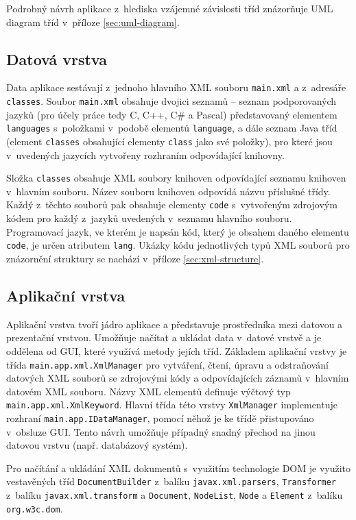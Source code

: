 \documentclass[czech,BP]{thesiskiv}
\begin{document}
\noindent
Podrobný návrh aplikace z~hlediska vzájemné závislosti tříd znázorňuje UML diagram tříd v~příloze \ref{sec:uml-diagram}.

\subsection{Datová vrstva}
Data aplikace sestávají z~jednoho hlavního XML souboru \texttt{main.xml} a z~adresáře \texttt{classes}. Soubor \texttt{main.xml} obsahuje dvojici seznamů -- seznam podporovaných jazyků (pro účely práce tedy C, C++, C\# a Pascal) představovaný elementem \texttt{languages} s~položkami v~podobě elementů \texttt{language}, a dále seznam Java tříd (element \texttt{classes} obsahující elementy \texttt{class} jako své položky), pro které jsou v~uvedených jazycích vytvořeny rozhraním odpovídající knihovny.\par
Složka \texttt{classes} obsahuje XML soubory knihoven odpovídající seznamu knihoven v~hlavním souboru. Název souboru knihoven odpovídá názvu příslušné třídy. Každý z~těchto souborů pak obsahuje elementy \texttt{code} s~vytvořeným zdrojovým kódem pro každý z~jazyků uvedených v~seznamu hlavního souboru. Programovací jazyk, ve kterém je napsán kód, který je obsahem daného elementu \texttt{code}, je určen atributem \texttt{lang}. Ukázky kódu jednotlivých typů XML souborů pro znázornění struktury se nachází v~příloze \ref{sec:xml-structure}.

\subsection{Aplikační vrstva}
Aplikační vrstva tvoří jádro aplikace a představuje prostředníka mezi datovou a prezentační vrstvou. Umožňuje načítat a ukládat data v~datové vrstvě a je oddělena od GUI, které využívá metody jejích tříd. Základem aplikační vrstvy je třída \texttt{main.app.xml.Xml\-Manager} pro vytváření, čtení, úpravu a odstraňování datových XML souborů se zdrojovými kódy a odpovídajících záznamů v~hlavním datovém XML souboru. Názvy XML elementů definuje výčtový typ \texttt{main.app.xml.XmlKeyword}. Hlavní třída této vrstvy \texttt{XmlManager} implementuje rozhraní \texttt{main.app.IDataManager}, pomocí něhož je ke třídě přistupováno v~obsluze GUI. Tento návrh umožňuje případný snadný přechod na jinou datovou vrstvu (např. databázový systém).\par
Pro načítání a ukládání XML dokumentů s~využitím technologie DOM je využito vestavěných tříd \texttt{DocumentBuilder} z~balíku \texttt{javax.xml.parsers}, \texttt{Transformer} z~balíku \texttt{javax.xml.transform} a \texttt{Document}, \texttt{NodeList}, \texttt{Node} a \texttt{Element} z~balíku \texttt{org.w3c.dom}.
\end{document}
